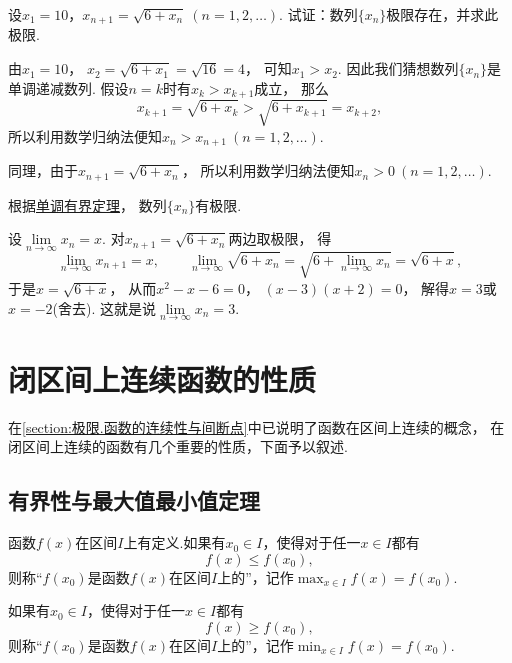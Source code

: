 \begin{example}
设\(x_1=10\)，\(x_{n+1}=\sqrt{6+x_n}\ (n=1,2,\dotsc)\).
试证：数列\(\{x_n\}\)极限存在，并求此极限.
\begin{solution}
由\(x_1=10\)，
\(x_2=\sqrt{6+x_1}=\sqrt{16}=4\)，
可知\(x_1>x_2\).
因此我们猜想数列\(\{x_n\}\)是单调递减数列.
假设\(n=k\)时有\(x_k>x_{k+1}\)成立，
那么\[
	x_{k+1}=\sqrt{6+x_k}>\sqrt{6+x_{k+1}}=x_{k+2},
\]
所以利用数学归纳法便知\(x_n>x_{n+1}\ (n=1,2,\dotsc)\).

同理，由于\(x_{n+1}=\sqrt{6+x_n}\)，
所以利用数学归纳法便知\(x_n>0\ (n=1,2,\dotsc)\).

根据\hyperref[theorem:极限.数列的单调有界定理]{单调有界定理}，
数列\(\{x_n\}\)有极限.

设\(\lim\limits_{n\to\infty}x_n=x\).
对\(x_{n+1}=\sqrt{6+x_n}\)两边取极限，
得\[
	\lim\limits_{n\to\infty}x_{n+1}=x, \qquad
	\lim\limits_{n\to\infty}\sqrt{6+x_n}
	=\sqrt{6+\lim\limits_{n\to\infty}x_n}
	=\sqrt{6+x},
\]
于是\(x=\sqrt{6+x}\)，
从而\(x^2-x-6=0\)，
\((x-3)(x+2)=0\)，
解得\(x=3\)或\(x=-2\)(舍去).
这就是说\(\lim\limits_{n\to\infty}x_n=3\).
\end{solution}
\end{example}

\section{闭区间上连续函数的性质}
在\cref{section:极限.函数的连续性与间断点}中已说明了函数在区间上连续的概念，
在闭区间上连续的函数有几个重要的性质，下面予以叙述.

\subsection{有界性与最大值最小值定理}
\begin{definition}
函数\(f(x)\)在区间\(I\)上有定义.如果有\(x_0 \in I\)，使得对于任一\(x \in I\)都有\[
f(x) \leq f(x_0),
\]则称“\(f(x_0)\)是函数\(f(x)\)在区间\(I\)上的”，记作\(\max_{x \in I}f(x) = f(x_0)\).

如果有\(x_0 \in I\)，使得对于任一\(x \in I\)都有\[
f(x) \geq f(x_0),
\]则称“\(f(x_0)\)是函数\(f(x)\)在区间\(I\)上的”，记作\(\min_{x \in I}f(x) = f(x_0)\).
\end{definition}


